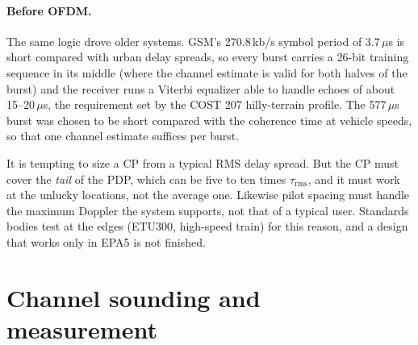 \paragraph{Before OFDM.} The same logic drove older systems. GSM's 270.8\,kb/s symbol period of
3.7\,$\mu$s is short compared with urban delay spreads, so every burst carries a 26-bit training
sequence in its middle (where the channel estimate is valid for both halves of the burst) and the
receiver runs a Viterbi equalizer able to handle echoes of about 15--20\,$\mu$s, the requirement set by
the COST 207 hilly-terrain profile. The 577\,$\mu$s burst was chosen to be short compared with the
coherence time at vehicle speeds, so that one channel estimate suffices per burst.

\begin{pitfall}
It is tempting to size a CP from a typical RMS delay spread. But the CP must cover the \emph{tail} of
the PDP, which can be five to ten times $\tau_{\text{rms}}$, and it must work at the unlucky locations,
not the average one. Likewise pilot spacing must handle the maximum Doppler the system supports, not
that of a typical user. Standards bodies test at the edges (ETU300, high-speed train) for this reason,
and a design that works only in EPA5 is not finished.
\end{pitfall}

\section{Channel sounding and measurement}
\label{sec:ch11:sounding}


